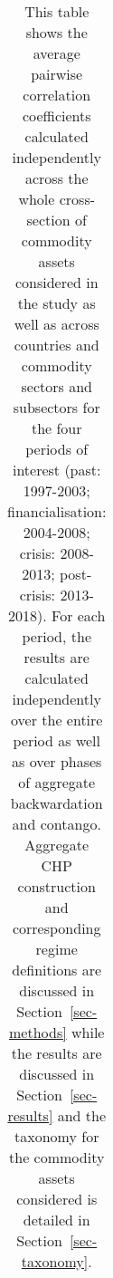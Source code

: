 \documentclass[
  authoryear,
  preprint,
  3p]{elsarticle}
\begin{document}
\newpage

\begingroup\fontsize{7}{9}\selectfont

\begin{longtable}[t]{>{}l>{}l>{}l>{}r>{}r>{}r>{}r>{}r}

\caption{\label{tbl-correlations-periods}This table shows the average
pairwise correlation coefficients calculated independently across the
whole cross-section of commodity assets considered in the study as well
as across countries and commodity sectors and subsectors for the four
periods of interest (past: 1997-2003; financialisation: 2004-2008;
crisis: 2008-2013; post-crisis: 2013-2018). For each period, the results
are calculated independently over the entire period as well as over
phases of aggregate backwardation and contango. Aggregate CHP
construction and corresponding regime definitions are discussed in
Section~\ref{sec-methods} while the results are discussed in
Section~\ref{sec-results} and the taxonomy for the commodity assets
considered is detailed in Section~\ref{sec-taxonomy}.}

\tabularnewline


\end{longtable}
\end{document}

